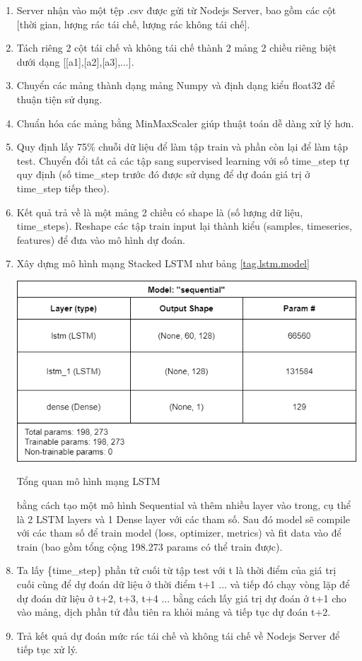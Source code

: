 \begin{enumerate}
    \item Server nhận vào một tệp .csv được gửi từ Nodejs Server, bao gồm các cột [thời gian, lượng rác tái chế, lượng rác không tái chế]. 
    \item Tách riêng 2 cột tái chế và không tái chế thành 2 mảng 2 chiều riêng biệt dưới dạng [[a1],[a2],[a3],...].
    \item Chuyển các mảng thành dạng mảng Numpy và định dạng kiểu float32 để thuận tiện sử dụng.
    \item Chuẩn hóa các mảng bằng MinMaxScaler giúp thuật toán dễ dàng xử lý hơn.
    \item Quy định lấy 75\% chuỗi dữ liệu để làm tập train và phần còn lại để làm tập test. Chuyển đổi tất cả các tập sang supervised learning với số time\_step tự quy định (số time\_step trước đó được sử dụng để dự đoán giá trị ở time\_step tiếp theo).
    \item Kết quả trả về là một mảng 2 chiều có shape là (số lượng dữ liệu, time\_steps). Reshape các tập train input lại thành kiểu (samples, timeseries, features) để đưa vào mô hình dự đoán.
    \item Xây dựng mô hình mạng Stacked LSTM như bảng \ref{tag.lstm.model}
    \begin{table}[H]
        \centering
        \includegraphics[width=\textwidth]{images/Khanh/Python/LSTM Model.PNG}
        \caption{Tổng quan mô hình mạng LSTM}
        \label{tag.lstm.model}
    \end{table}
    bằng cách tạo một mô hình Sequential và thêm nhiều layer vào trong, cụ thể là 2 LSTM layers và 1 Dense layer với các tham số. Sau đó model sẽ compile với các tham số để train model (loss, optimizer, metrics) và fit data vào để train (bao gồm tổng cộng 198.273 params có thể train được).
    \item Ta lấy \{time\_step\} phần tử cuối từ tập test với t là thời điểm của giá trị cuối cùng để dự đoán dữ liệu ở thời điểm t+1 ... và tiếp đó chạy vòng lặp để dự đoán dữ liệu ở t+2, t+3, t+4 ... bằng cách lấy giá trị dự đoán ở t+1 cho vào mảng, dịch phần tử đầu tiên ra khỏi mảng và tiếp tục dự đoán t+2.
    \item Trả kết quả dự đoán mức rác tái chế và không tái chế về Nodejs Server để tiếp tục xử lý. 
\end{enumerate}

